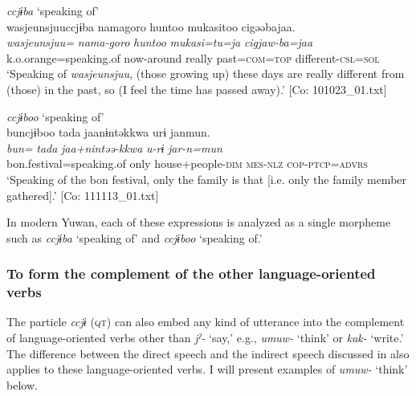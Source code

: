 \ea\label{ex:10.68}
\ea \textit{ccjɨba} ‘speaking of’\\
      \glll    {\textbar}wasjeunsjuu{\textbar}ccjɨba  nama{\textbar}goro{\textbar}  huntoo  mukasitoo  cigəəbajaa.\\
    \textit{wasjeunsjuu=}  \textit{nama-goro}  \textit{huntoo}  \textit{mukasi=tu=ja}  \textit{cigjaw-ba=jaa}\\
    k.o.orange=speaking.of  now-around  really  past=\textsc{com}=\textsc{top}  different-\textsc{csl}=\textsc{sol}\\
\glt     ‘Speaking of \textit{wasjeunsjuu}, (those growing up) these days are really different from (those) in the past, so (I feel the time has passed away).’  [Co: 101023\_01.txt]

  \ex \textit{ccjɨboo} ‘speaking of’\\
      \glll    buncjɨboo  {\textbar}tada{\textbar}  jaanɨntəkkwa  urɨ  janmun.\\
    \textit{bun=}  \textit{tada}  \textit{jaa+nintəə-kkwa}  \textit{u-rɨ}  \textit{jar-n=mun}\\
    bon.festival=speaking.of  only  house+people{}-\textsc{dim}  \textsc{mes}-\textsc{nlz}  \textsc{cop}-\textsc{ptcp}=\textsc{advrs}\\
    \glt     ‘Speaking of the bon festival, only the family is that [i.e. only the family member gathered].’  [Co: 111113\_01.txt]
    \z
\z

In modern Yuwan, each of these expressions is analyzed as a single morpheme such as \textit{ccjɨba} ‘speaking of’ and \textit{ccjɨboo} ‘speaking of.’

\subsubsection{To form the complement of the other language-oriented verbs}\label{sec:10.4.1.2}

The particle \textit{ccjɨ} (\textsc{qt}) can also embed any kind of utterance into the complement of language-oriented verbs other than \textit{jˀ-} ‘say,’ e.g., \textit{umuw-} ‘think’ or \textit{kak-} ‘write.’ The difference between the direct speech and the indirect speech discussed in  also applies to these language-oriented verbs. I will present examples of \textit{umuw-} ‘think’ below.

